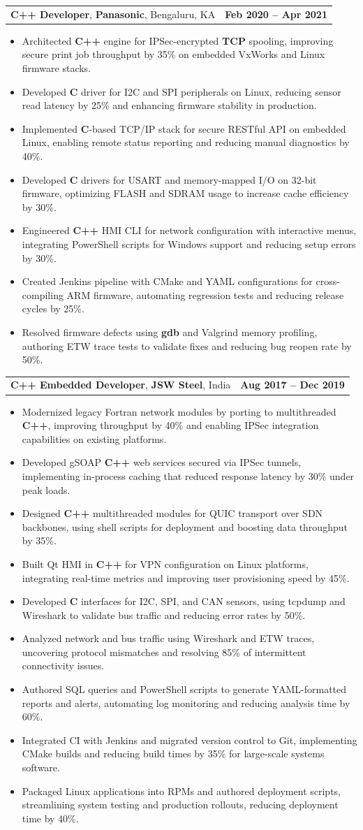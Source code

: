 \documentclass[letterpaper,11pt]{article}
\makeatletter
\newcommand{\resumeItem}[1]{
  \item\footnotesize{
    {#1 \vspace{-2pt}}
  }
}
\newcommand{\resumeSubheading}[4]{
  \vspace{-2pt}\item
    \begin{tabular*}{1.0\textwidth}[t]{l@{\extracolsep{\fill}}r}
      \textbf{\fontsize{10pt}{14pt}\selectfont #3}, \textbf{\fontsize{10pt}{14pt}\selectfont #1}, \fontsize{10pt}{14pt}\selectfont #4 & \textbf{\fontsize{10pt}{14pt}\selectfont #2} \\
    \end{tabular*}\vspace{-7pt}
}
\newcommand{\resumeItemListStart}{\begin{itemize}[leftmargin=*]}
\newcommand{\resumeItemListEnd}{\end{itemize}\vspace{-5pt}}
\makeatother
\begin{document}
    \resumeSubheading
        {Panasonic}{Feb 2020 -- Apr 2021}
        {C++ Developer}{Bengaluru, KA}
      \resumeItemListStart
        \resumeItem{Architected \textbf{C++} engine for IPSec-encrypted \textbf{TCP} spooling, improving secure print job throughput by 35\% on embedded VxWorks and Linux firmware stacks.}
        \resumeItem{Developed \textbf{C} driver for I2C and SPI peripherals on Linux, reducing sensor read latency by 25\% and enhancing firmware stability in production.}
        \resumeItem{Implemented \textbf{C}-based TCP/IP stack for secure RESTful API on embedded Linux, enabling remote status reporting and reducing manual diagnostics by 40\%.}
        \resumeItem{Developed \textbf{C} drivers for USART and memory-mapped I/O on 32-bit firmware, optimizing FLASH and SDRAM usage to increase cache efficiency by 30\%.}
        \resumeItem{Engineered \textbf{C++} HMI CLI for network configuration with interactive menus, integrating PowerShell scripts for Windows support and reducing setup errors by 30\%.}
        \resumeItem{Created Jenkins pipeline with CMake and YAML configurations for cross-compiling ARM firmware, automating regression tests and reducing release cycles by 25\%.}
        \resumeItem{Resolved firmware defects using \textbf{gdb} and Valgrind memory profiling, authoring ETW trace tests to validate fixes and reducing bug reopen rate by 50\%.}
      \resumeItemListEnd

    \resumeSubheading
        {JSW Steel}{Aug 2017 -- Dec 2019}
        {C++ Embedded Developer}{India}
      \resumeItemListStart
        \resumeItem{Modernized legacy Fortran network modules by porting to multithreaded \textbf{C++}, improving throughput by 40\% and enabling IPSec integration capabilities on existing platforms.}
        \resumeItem{Developed gSOAP \textbf{C++} web services secured via IPSec tunnels, implementing in-process caching that reduced response latency by 30\% under peak loads.}
        \resumeItem{Designed \textbf{C++} multithreaded modules for QUIC transport over SDN backbones, using shell scripts for deployment and boosting data throughput by 35\%.}
        \resumeItem{Built Qt HMI in \textbf{C++} for VPN configuration on Linux platforms, integrating real-time metrics and improving user provisioning speed by 45\%.}
        \resumeItem{Developed \textbf{C} interfaces for I2C, SPI, and CAN sensors, using tcpdump and Wireshark to validate bus traffic and reducing error rates by 50\%.}
        \resumeItem{Analyzed network and bus traffic using Wireshark and ETW traces, uncovering protocol mismatches and resolving 85\% of intermittent connectivity issues.}
        \resumeItem{Authored SQL queries and PowerShell scripts to generate YAML-formatted reports and alerts, automating log monitoring and reducing analysis time by 60\%.}
        \resumeItem{Integrated CI with Jenkins and migrated version control to Git, implementing CMake builds and reducing build times by 35\% for large-scale systems software.}
        \resumeItem{Packaged Linux applications into RPMs and authored deployment scripts, streamlining system testing and production rollouts, reducing deployment time by 40\%.}
      \resumeItemListEnd
\end{document}
